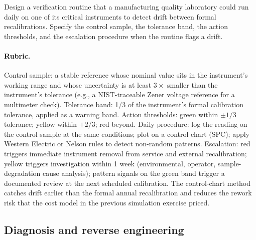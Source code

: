 \begin{exercise}
Design a verification routine that a manufacturing quality
laboratory could run daily on one of its critical instruments to
detect drift between formal recalibrations. Specify the control
sample, the tolerance band, the action thresholds, and the
escalation procedure when the routine flags a drift.

\paragraph{Rubric.} Control sample: a stable reference whose
nominal value sits in the instrument's working range and whose
uncertainty is at least $3\times$ smaller than the instrument's
tolerance (e.g., a NIST-traceable Zener voltage reference for a
multimeter check). Tolerance band: 1/3 of the instrument's
formal calibration tolerance, applied as a warning band. Action
thresholds: green within $\pm 1/3$ tolerance; yellow within
$\pm 2/3$; red beyond. Daily procedure: log the reading on the
control sample at the same conditions; plot on a control chart
(SPC); apply Western Electric or Nelson rules to detect non-random
patterns. Escalation: red triggers immediate instrument removal
from service and external recalibration; yellow triggers
investigation within 1 week (environmental, operator,
sample-degradation cause analysis); pattern signals on the green
band trigger a documented review at the next scheduled
calibration. The control-chart method catches drift earlier than
the formal annual recalibration and reduces the rework risk that
the cost model in the previous simulation exercise priced.
\end{exercise}

\subsection*{Diagnosis and reverse engineering}

